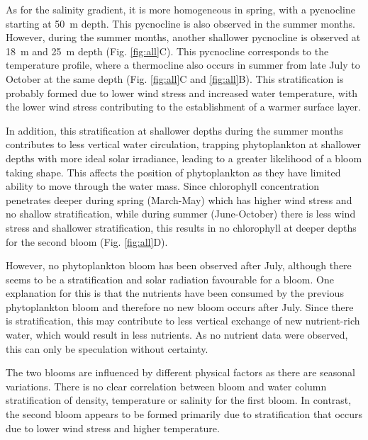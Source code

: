 \documentclass[../Main.tex]{subfiles}
\begin{document}
As for the salinity gradient, it is more homogeneous in spring, with a pycnocline starting at \SI{50}{m} depth. This pycnocline is also observed in the summer months. However, during the summer months, another shallower pycnocline is observed at \SI{18}{m} and \SI{25}{m} depth (Fig. \ref{fig:all}C). This pycnocline corresponds to the temperature profile, where a thermocline also occurs in summer from late July to October at the same depth (Fig. \ref{fig:all}C and \ref{fig:all}B). This stratification is probably formed due to lower wind stress and increased water temperature, with the lower wind stress contributing to the establishment of a warmer surface layer\supercite{carey2012eco}.

In addition, this stratification at shallower depths during the summer months contributes to less vertical water circulation, trapping phytoplankton at shallower depths with more ideal solar irradiance, leading to a greater likelihood of a bloom taking shape. This affects the position of phytoplankton as they have limited ability to move through the water mass\supercite{kase2018phytoplankton}.
Since chlorophyll concentration penetrates deeper during spring (March-May) which has higher wind stress and no shallow stratification, while during summer (June-October) there is less wind stress and shallower stratification, this results in no chlorophyll at deeper depths for the second bloom (Fig. \ref{fig:all}D).

However, no phytoplankton bloom has been observed after July, although there seems to be a stratification and solar radiation favourable for a bloom. One explanation for this is that the nutrients have been consumed by the previous phytoplankton bloom and therefore no new bloom occurs after July. Since there is stratification, this may contribute to less vertical exchange of new nutrient-rich water, which would result in less nutrients. As no nutrient data were observed, this can only be speculation without certainty. 

The two blooms are influenced by different physical factors as there are seasonal variations. There is no clear correlation between bloom and water column stratification of density, temperature or salinity for the first bloom. In contrast, the second bloom appears to be formed primarily due to stratification that occurs due to lower wind stress and higher temperature. 
\end{document}
